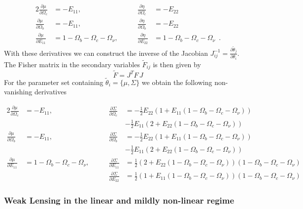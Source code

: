 \begin{alignat}{2}
\frac{\partial\mu}{\partial\Omega_{c}} & =-E_{11},\qquad &
\frac{\partial\eta}{\partial\Omega_{c}} & =-E_{22}\\
\frac{\partial\mu}{\partial\Omega_{b}} & =-E_{11},\qquad &
\frac{\partial\eta}{\partial\Omega_{b}} & =-E_{22}\\
\frac{\partial\mu}{\partial E_{11}} &
=1-\Omega_{b}-\Omega_{c}-\Omega_{\nu},\qquad & \frac{\partial\eta}{\partial
	E_{22}} & =1-\Omega_{b}-\Omega_{c}-\Omega_{\nu} \,\,\, .
\end{alignat}
With these derivatives we can construct the inverse of the Jacobian
$J_{ij}^{-1}=\frac{\partial\tilde{\theta}_{j}}{\partial\theta_{i}}$.
The Fisher matrix in the secondary variables $\tilde{F}{}_{ij}$ is
then given by 
\begin{equation}
\tilde{F}=J^{T}F\,J
\end{equation}
For the parameter set containing $\tilde{\theta}_{i}=\{\mu,\Sigma\}$
we obtain the following non-vanishing derivatives 

\begin{alignat}{2} 
\frac{\partial\mu}{\partial\Omega_{c}} & =-E_{11},\qquad &
\frac{\partial\Sigma}{\partial\Omega_{c}} &
=-\frac{1}{2}E_{22}(1+E_{11}(1-\Omega_{b}-\Omega_{c}-\Omega_{\nu}))\\
&  &  & -\frac{1}{2}E_{11}(2+E_{22}(1-\Omega_{b}-\Omega_{c}-\Omega_{\nu}))\\
\frac{\partial\mu}{\partial\Omega_{b}} & =-E_{11},\qquad &
\frac{\partial\Sigma}{\partial\Omega_{b}} &
=-\frac{1}{2}E_{22}(1+E_{11}(1-\Omega_{b}-\Omega_{c}-\Omega_{\nu}))\\
&  &  & -\frac{1}{2}E_{11}(2+E_{22}(1-\Omega_{b}-\Omega_{c}-\Omega_{\nu}))\\
\frac{\partial\mu}{\partial E_{11}} &
=1-\Omega_{b}-\Omega_{c}-\Omega_{\nu},\qquad & \frac{\partial\Sigma}{\partial
	E_{11}} &
=\frac{1}{2}(2+E_{22}(1-\Omega_{b}-\Omega_{c}-\Omega_{\nu}))(1-\Omega_{b}-\Omega_{c}-\Omega_{\nu})\\
&  & \frac{\partial\Sigma}{\partial E_{22}} &
=\frac{1}{2}(1+E_{11}(1-\Omega_{b}-\Omega_{c}-\Omega_{\nu}))(1-\Omega_{b}-\Omega_{c}-\Omega_{\nu})
\end{alignat}

\subsubsection{Weak Lensing in the linear and mildly non-linear regime}

